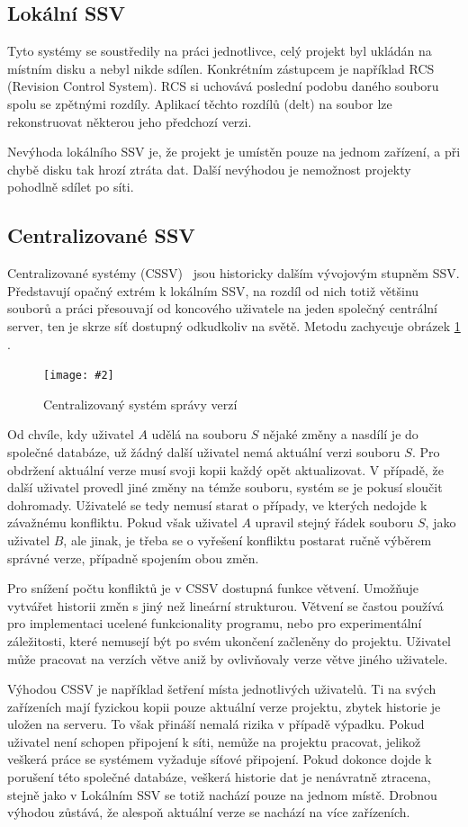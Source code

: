 \documentclass[
  biblatex,
  glossaries,
  index
]{kidiplom}
\newcommand{\pic}[4]{
\begin{figure}[h]
\centering
\texttt{[image: \#2]}
\caption{#3}
\label{fig:#4}
\end{figure}}
\begin{document}
\subsection{Lokální SSV}
Tyto systémy se soustředily na práci jednotlivce, celý projekt byl 
ukládán na místním disku a nebyl nikde sdílen. Konkrétním zástupcem je 
například RCS (Revision Control System). RCS si uchovává poslední podobu  
daného souboru spolu se zpětnými rozdíly. Aplikací těchto rozdílů (delt) 
na soubor lze rekonstruovat některou jeho předchozí verzi.

Nevýhoda lokálního SSV je, že projekt je umístěn pouze na jednom 
zařízení, a při chybě disku tak hrozí ztráta dat. Další nevýhodou je 
nemožnost projekty pohodlně sdílet po síti.

\subsection{Centralizované SSV}
Centralizované systémy (CSSV)~\cite{otte} jsou historicky dalším vývojovým stupněm SSV. 
Představují opačný extrém k lokálním SSV, na rozdíl od nich totiž 
většinu souborů a práci přesouvají od koncového uživatele na jeden 
společný centrální server, ten je skrze síť dostupný odkudkoliv na světě. Metodu zachycuje obrázek \ref{fig:centralized} \cite{gitreference}.

\pic{10cm}{centralized.png}{Centralizovaný systém správy verzí}{centralized}

Od chvíle, kdy uživatel $A$ udělá na souboru $S$ nějaké změny a nasdílí
je do společné databáze, už žádný další uživatel nemá aktuální
verzi souboru $S$.
Pro obdržení aktuální verze musí svoji kopii každý opět aktualizovat.
V případě, že další uživatel provedl jiné změny na témže souboru,
systém se je pokusí sloučit dohromady. Uživatelé se tedy nemusí starat o 
případy, ve kterých nedojde k závažnému konfliktu. Pokud však uživatel $A$ 
upravil stejný řádek souboru $S$, jako uživatel $B$, ale jinak, je třeba se 
o vyřešení konfliktu postarat ručně výběrem správné verze, případně
spojením obou změn.

Pro snížení počtu konfliktů je v CSSV dostupná funkce větvení. Umožňuje 
vytvářet historii změn s jiný než lineární strukturou. Větvení se častou 
používá pro implementaci ucelené funkcionality programu, nebo pro 
experimentální záležitosti, které nemusejí být po svém ukončení začleněny 
do projektu. Uživatel může pracovat na verzích větve aniž by ovlivňovaly
verze větve jiného uživatele.

Výhodou CSSV je například
šetření místa jednotlivých uživatelů. Ti na svých zařízeních mají fyzickou 
kopii pouze aktuální verze projektu, zbytek historie je uložen na serveru.
To však přináší nemalá rizika v případě výpadku. Pokud uživatel není
schopen připojení k síti, nemůže na projektu pracovat, jelikož veškerá
práce se systémem vyžaduje síťové připojení. Pokud dokonce dojde k
porušení této společné databáze, veškerá historie dat je nenávratně
ztracena, stejně jako v Lokálním SSV se totiž nachází pouze na jednom místě. Drobnou výhodou 
zůstává, že alespoň aktuální verze se nachází na více zařízeních.
\end{document}
